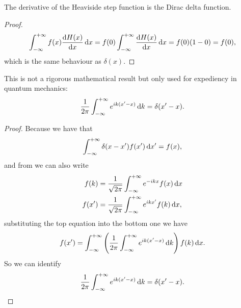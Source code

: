 \begin{prt}
The derivative of the Heaviside step function is the Dirac delta function.
\end{prt}
\begin{proof}
\begin{equation}
\intinf f(x)\diff{H(x)}{x}\dx=f(0)\intinf\diff{H(x)}{x}\dx=f(0)(1-0)=f(0),
\end{equation}
which is the same behaviour as $\delta(x)$.
\end{proof}
\begin{prt}
\label{delta_fourier}
This is not a rigorous mathematical result but only used for expediency in quantum mechanics: 
\begin{equation}
\frac{1}{2\pi}\intinf e^{ik(x'-x)}\dif k=\delta(x'-x).
\end{equation}
\end{prt}
\begin{proof}
Because we have that
\begin{equation}
\intinf\delta(x-x')f(x')\dif x'=f(x), 
\end{equation}
and from  we can also write
\begin{subequations}
\begin{align}
f(k)&=\frac{1}{\sqrt{2\pi}}\intinf e^{-ikx}f(x)\dx\\
f(x')&=\frac{1}{\sqrt{2\pi}}\intinf e^{ikx'}f(k)\dx, 
\end{align}
\end{subequations}
substituting the top equation into the bottom one we have
\begin{equation}
f(x')=\intinf\lf(\frac{1}{2\pi}\intinf e^{ik(x'-x)}\dif k \rt)f(k)\dx.
\end{equation}
So we can identify
\begin{equation}
\frac{1}{2\pi}\intinf e^{ik(x'-x)}\dif k=\delta(x'-x).
\end{equation}
\end{proof}

